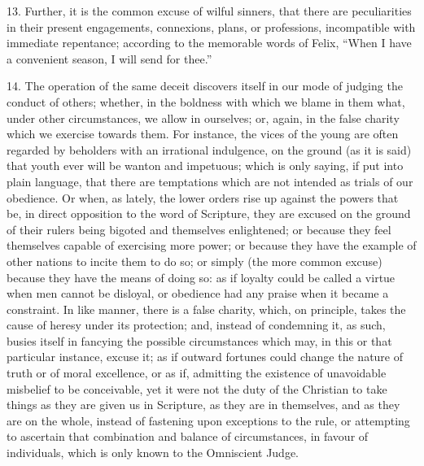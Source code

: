 13. Further, it is the common excuse of wilful sinners, that there
are peculiarities in their present engagements, connexions, plans, or
professions, incompatible with immediate repentance; according to the
memorable words of Felix, ``When I have a convenient season, I
will send for thee.''

14. The operation of the same deceit discovers itself in our mode
of judging the conduct of others; whether, in the boldness with which
we blame in them what, under other circumstances, we allow in
ourselves; or, again, in the false charity which we exercise towards
them. For instance, the vices of the young are often regarded by
beholders with an irrational indulgence, on the ground (as it is said)
that youth ever will be wanton and impetuous; which is only saying, if
put into plain language, that there are temptations which are not
intended as trials of our obedience. Or when, as lately, the lower
orders rise up against the powers that be, in direct opposition to the
word of Scripture, they are excused on the ground of their rulers
being bigoted and themselves enlightened; or because they feel
themselves capable of exercising more power; or because they have the
example of other nations to incite them to do so; or simply (the more
common excuse) because they have the means of doing so: as if loyalty
could be called a virtue when men cannot be disloyal, or obedience had
any praise when it became a constraint. In like manner, there is a
false charity, which, on principle, takes the cause of heresy under
its protection; and, instead of condemning it, as such, busies itself
in fancying the possible circumstances which may, in this or that
particular instance, excuse it; as if outward fortunes could change
the nature of truth or of moral excellence, or as if, admitting the
existence of unavoidable misbelief to be conceivable, yet it were not
the duty of the Christian to take things as they are given us in
Scripture, as they are in themselves, and as they are on the whole,
instead of fastening upon exceptions to the rule, or attempting to
ascertain that combination and balance of circumstances, in favour of
individuals, which is only known to the Omniscient Judge.

